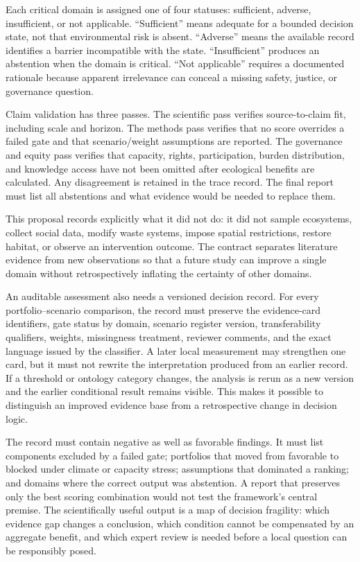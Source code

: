 \documentclass[conference]{IEEEtran}
\begin{document}
Each critical domain is assigned one of four statuses: sufficient, adverse, insufficient, or not applicable. ``Sufficient'' means adequate for a bounded decision state, not that environmental risk is absent. ``Adverse'' means the available record identifies a barrier incompatible with the state. ``Insufficient'' produces an abstention when the domain is critical. ``Not applicable'' requires a documented rationale because apparent irrelevance can conceal a missing safety, justice, or governance question.

Claim validation has three passes. The scientific pass verifies source-to-claim fit, including scale and horizon. The methods pass verifies that no score overrides a failed gate and that scenario/weight assumptions are reported. The governance and equity pass verifies that capacity, rights, participation, burden distribution, and knowledge access have not been omitted after ecological benefits are calculated. Any disagreement is retained in the trace record. The final report must list all abstentions and what evidence would be needed to replace them.

This proposal records explicitly what it did not do: it did not sample ecosystems, collect social data, modify waste systems, impose spatial restrictions, restore habitat, or observe an intervention outcome. The contract separates literature evidence from new observations so that a future study can improve a single domain without retrospectively inflating the certainty of other domains.

An auditable assessment also needs a versioned decision record. For every portfolio--scenario comparison, the record must preserve the evidence-card identifiers, gate status by domain, scenario register version, transferability qualifiers, weights, missingness treatment, reviewer comments, and the exact language issued by the classifier. A later local measurement may strengthen one card, but it must not rewrite the interpretation produced from an earlier record. If a threshold or ontology category changes, the analysis is rerun as a new version and the earlier conditional result remains visible. This makes it possible to distinguish an improved evidence base from a retrospective change in decision logic.

The record must contain negative as well as favorable findings. It must list components excluded by a failed gate; portfolios that moved from favorable to blocked under climate or capacity stress; assumptions that dominated a ranking; and domains where the correct output was abstention. A report that preserves only the best scoring combination would not test the framework's central premise. The scientifically useful output is a map of decision fragility: which evidence gap changes a conclusion, which condition cannot be compensated by an aggregate benefit, and which expert review is needed before a local question can be responsibly posed.
\end{document}
